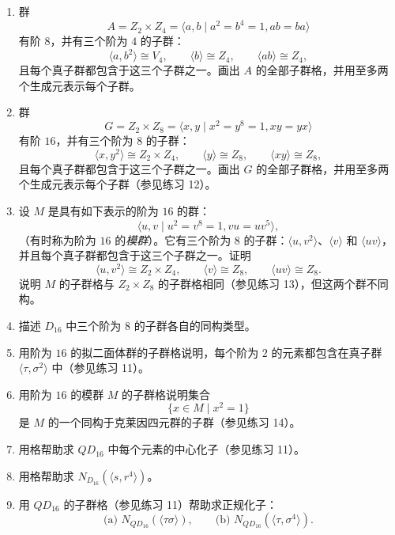 \begin{enumerate}[label=\arabic*.]
  \item 群
  \[
    A=Z_2\times Z_4=\langle a,b\mid a^2=b^4=1,
    ab=ba\rangle
  \]
  有阶 $8$，并有三个阶为 $4$ 的子群：
  \[
    \langle a,b^2\rangle\cong V_4,
    \qquad
    \langle b\rangle\cong Z_4,
    \qquad
    \langle ab\rangle\cong Z_4,
  \]
  且每个真子群都包含于这三个子群之一。画出 $A$ 的全部子群格，并用至多两个生成元表示每个子群。
  \item 群
  \[
    G=Z_2\times Z_8=\langle x,y\mid x^2=y^8=1,
    xy=yx\rangle
  \]
  有阶 $16$，并有三个阶为 $8$ 的子群：
  \[
    \langle x,y^2\rangle\cong Z_2\times Z_4,
    \qquad
    \langle y\rangle\cong Z_8,
    \qquad
    \langle xy\rangle\cong Z_8,
  \]
  且每个真子群都包含于这三个子群之一。画出 $G$ 的全部子群格，并用至多两个生成元表示每个子群（参见练习 12）。
  \item 设 $M$ 是具有如下表示的阶为 $16$ 的群：
  \[
    \langle u,v\mid u^2=v^8=1,
    vu=uv^5\rangle,
  \]
  （有时称为阶为 $16$ 的\emph{模群}）。它有三个阶为 $8$ 的子群：$\langle u,v^2\rangle$、$\langle v\rangle$ 和 $\langle uv\rangle$，并且每个真子群都包含于这三个子群之一。证明
  \[
    \langle u,v^2\rangle\cong Z_2\times Z_4,
    \qquad
    \langle v\rangle\cong Z_8,
    \qquad
    \langle uv\rangle\cong Z_8.
  \]
  说明 $M$ 的子群格与 $Z_2\times Z_8$ 的子群格相同（参见练习 13），但这两个群不同构。
  \item 描述 $D_{16}$ 中三个阶为 $8$ 的子群各自的同构类型。
  \item 用阶为 $16$ 的拟二面体群的子群格说明，每个阶为 $2$ 的元素都包含在真子群 $\langle\tau,\sigma^2\rangle$ 中（参见练习 11）。
  \item 用阶为 $16$ 的模群 $M$ 的子群格说明集合
  \[
    \{x\in M\mid x^2=1\}
  \]
  是 $M$ 的一个同构于克莱因四元群的子群（参见练习 14）。
  \item 用格帮助求 $QD_{16}$ 中每个元素的中心化子（参见练习 11）。
  \item 用格帮助求 $N_{D_{16}}(\langle s,r^4\rangle)$。
  \item 用 $QD_{16}$ 的子群格（参见练习 11）帮助求正规化子：
  \[
    \text{(a) }N_{QD_{16}}(\langle\tau\sigma\rangle),
    \qquad
    \text{(b) }N_{QD_{16}}(\langle\tau,\sigma^4\rangle).
  \]
\end{enumerate}
